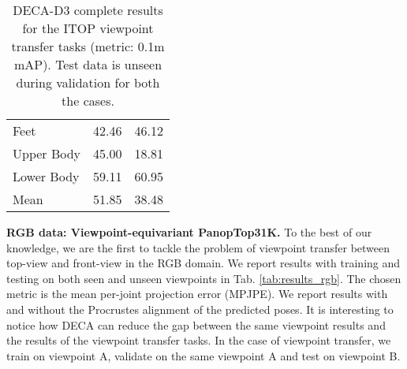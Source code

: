 \documentclass[10pt,twocolumn,letterpaper]{article}
\begin{document}
\begin{table}[]
{\begin{tabular}{@{}lcc@{}}
Feet       & 42.46                                                                           & 46.12                                                                              \\
Upper Body & 45.00                                                                           & 18.81                                                                              \\
Lower Body & 59.11                                                                           & 60.95                                                                              \\
Mean       & 51.85                                                                           & 38.48                                                                              \\ \bottomrule
\end{tabular}}
\caption{DECA-D3 complete results for the ITOP viewpoint transfer tasks (metric: 0.1m mAP). Test data is unseen during validation for both the cases.}
\label{tab:viewpoint_transfer_ITOP_both}
\end{table}


\textbf{RGB data: Viewpoint-equivariant PanopTop31K.} 
To the best of our knowledge, we are the first to tackle the problem of viewpoint transfer between top-view and front-view in the RGB domain. We report results with training and testing on both seen and unseen viewpoints in Tab. \ref{tab:results_rgb}. The chosen metric is the mean per-joint projection error (MPJPE). We report results with and without the Procrustes alignment \cite{goodall1991procrustes} of the predicted poses. It is interesting to notice how DECA can reduce the gap between the same viewpoint results and the results of the viewpoint transfer tasks. In the case of viewpoint transfer, we train on viewpoint A, validate on the same viewpoint A and test on viewpoint B.
\end{document}
